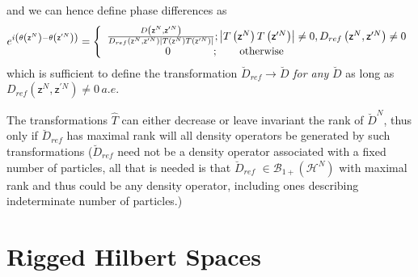 \documentclass[aps,preprint]{revtex4}%
\begin{document}
and we can hence define phase differences as
\begin{equation}
e^{i\left(  \theta\left(  \mathsf{z}^{N}\right)  -\theta\left(  \mathsf{z}%
^{\prime N}\right)  \right)  }=\left\{
\begin{array}
[c]{c}%
\frac{D\left(  \mathsf{z}^{N},\mathsf{z}^{\prime N}\right)  }{D_{ref}\left(
\mathsf{z}^{N},\mathsf{z}^{\prime N}\right)  \left\vert T\left(
\mathsf{z}^{N}\right)  T\left(  \mathsf{z}^{\prime N}\right)  \right\vert
};\left\vert T\left(  \mathsf{z}^{N}\right)  T\left(  \mathsf{z}^{\prime
N}\right)  \right\vert \neq0,D_{ref}\left(  \mathsf{z}^{N},\mathsf{z}^{\prime
N}\right)  \neq0\\
\text{\qquad\qquad}0\qquad\text{\qquad};\text{\qquad otherwise\qquad
\qquad\qquad\qquad\qquad}%
\end{array}
\right.
\end{equation}
which is sufficient to define the transformation $\breve{D}_{ref}%
\rightarrow\breve{D}$ \emph{for any }$\breve{D}$ as long as $D_{ref}\left(
\mathsf{z}^{N},\mathsf{z}^{\prime N}\right)  \neq0\,a.e.$

The transformations $\hat{T}$ can either decrease or leave invariant the rank
of $\breve{D}^{N}$, thus only if $\breve{D}_{ref}$ has maximal rank will all
density operators be generated by such transformations ($\breve{D}_{ref}$ need
not be a density operator associated with a fixed number of particles, all
that is needed is that $\breve{D}_{ref}$ $\in\mathcal{B}_{1+}\left(
\mathcal{H}^{N}\right)  $ with maximal rank and thus could be any density
operator, including ones describing indeterminate number of particles.)

\section{Rigged Hilbert Spaces\label{rigged}}
\end{document}
